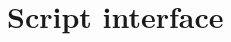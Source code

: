 \documentclass[Orbiter User Manual.tex]{subfiles}
\begin{document}
\section{Script interface}

\end{document}
